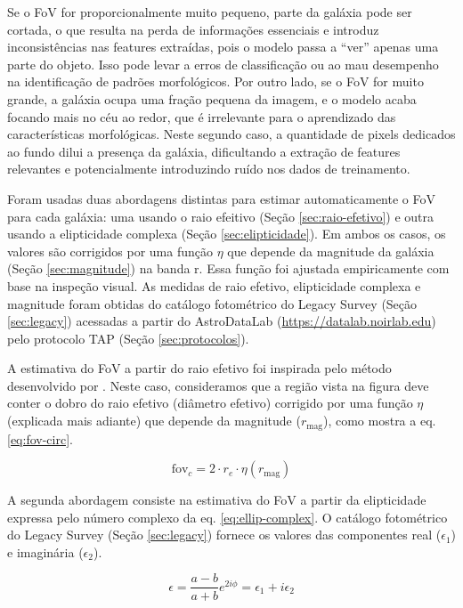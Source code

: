 Se o FoV for proporcionalmente muito pequeno, parte da galáxia pode ser cortada, o que resulta na perda de informações essenciais e introduz inconsistências nas features extraídas, pois o modelo passa a ``ver'' apenas uma parte do objeto. Isso pode levar a erros de classificação ou ao mau desempenho na identificação de padrões morfológicos. Por outro lado, se o FoV for muito grande, a galáxia ocupa uma fração pequena da imagem, e o modelo acaba focando mais no céu ao redor, que é irrelevante para o aprendizado das características morfológicas. Neste segundo caso, a quantidade de pixels dedicados ao fundo dilui a presença da galáxia, dificultando a extração de features relevantes e potencialmente introduzindo ruído nos dados de treinamento.

Foram usadas duas abordagens distintas para estimar automaticamente o FoV para cada galáxia: uma usando o raio efeitivo (Seção \ref{sec:raio-efetivo}) e outra usando a elipticidade complexa (Seção \ref{sec:elipticidade}). Em ambos os casos, os valores são corrigidos por uma função $\eta$ que depende da magnitude da galáxia (Seção \ref{sec:magnitude}) na banda r. Essa função foi ajustada empiricamente com base na inspeção visual. As medidas de raio efetivo, elipticidade complexa e magnitude foram obtidas do catálogo fotométrico do Legacy Survey (Seção \ref{sec:legacy}) acessadas a partir do AstroDataLab (\url{https://datalab.noirlab.edu}) pelo protocolo TAP (Seção \ref{sec:protocolos}).

A estimativa do FoV a partir do raio efetivo foi inspirada pelo método desenvolvido por . Neste caso, consideramos que a região vista na figura deve conter o dobro do raio efetivo (diâmetro efetivo) corrigido por uma função $\eta$ (explicada mais adiante) que depende da magnitude ($r_\mathrm{mag}$), como mostra a eq. \eqref{eq:fov-circ}.

\begin{equation}\label{eq:fov-circ}
  \mathrm{fov}_c = 2 \cdot r_e \cdot \eta(r_\mathrm{mag})
\end{equation}

A segunda abordagem consiste na estimativa do FoV a partir da elipticidade expressa pelo número complexo da eq. \eqref{eq:ellip-complex}. O catálogo fotométrico do Legacy Survey (Seção \ref{sec:legacy}) fornece os valores das componentes real ($\epsilon_1$) e imaginária ($\epsilon_2$).

\begin{equation}\label{eq:ellip-complex}
  \epsilon = \frac{a-b}{a+b} e^{2i\phi} = \epsilon_1 + i\epsilon_2
\end{equation}


